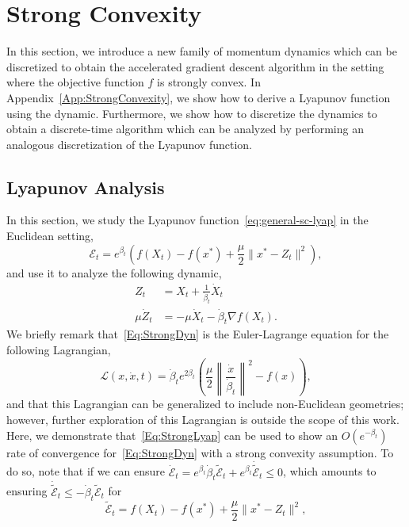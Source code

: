 \documentclass[11pt]{article}
\theoremstyle{plain}
\newcommand{\E}{{\mathcal E}}
\begin{document}
\section{Strong Convexity}
In this section, we introduce a new family of momentum dynamics which can be discretized to obtain the accelerated gradient descent algorithm in the setting where the objective function $f$ is strongly convex. In Appendix~\ref{App:StrongConvexity}, we show how to derive a Lyapunov function using the dynamic. Furthermore, we show how to discretize the dynamics to obtain a discrete-time algorithm which can be analyzed by performing an analogous discretization of the Lyapunov function. 
\label{Sec:StrongConv}
\subsection{Lyapunov Analysis}
In this section, we study the Lyapunov function~\eqref{eq:general-sc-lyap} in the Euclidean setting,
\begin{equation}\label{Eq:StrongLyap}
\E_t = e^{\beta_t}\left(f(X_t) - f(x^\ast) + \frac{\mu}{2}\|x^\ast- Z_t \|^2\right),
\end{equation}
and use it to analyze the following dynamic, 
\begin{subequations}\label{Eq:StrongDyn}
\begin{align}
Z_t &= X_t + \frac{1}{\dot \beta_t} \dot X_t\\
\mu \dot Z_t &= - \mu\dot X_t - \dot \beta_t \nabla f(X_t).
\end{align}
\end{subequations}
We briefly remark that~\eqref{Eq:StrongDyn} is the Euler-Lagrange equation for the following Lagrangian,
\begin{equation}\label{Eq:LagStrongConv}
\mathcal{L}(x, \dot x, t) = \dot \beta_t e^{2\beta_t} \left(\frac{\mu}{2}\left\|\frac{\dot x}{\dot \beta_t}\right\|^2 - f(x)\right),
\end{equation}
and that this Lagrangian can be generalized to include non-Euclidean geometries; however, further exploration of this Lagrangian is outside the scope of this work. Here, we demonstrate that~\eqref{Eq:StrongLyap} can be used to show an $O(e^{-\beta_t})$ rate of convergence for~\eqref{Eq:StrongDyn} with a strong convexity assumption. To do so, note that if we can ensure  $\dot \E_t = e^{\beta_t}\dot \beta_t \tilde{\E}_t + e^{\beta_t} \dot{\tilde{\E}}_t \leq 0$, which amounts to ensuring
$\dot{\tilde{\E}}_t \leq - \dot \beta_t \tilde{\E}_t$
for 
\begin{equation}\label{Eq:StrongLyap2}
\tilde \E_t = f(X_t) - f(x^\ast) + \frac{\mu}{2}\|x^\ast - Z_t \|^2,
\end{equation}
\end{document}
